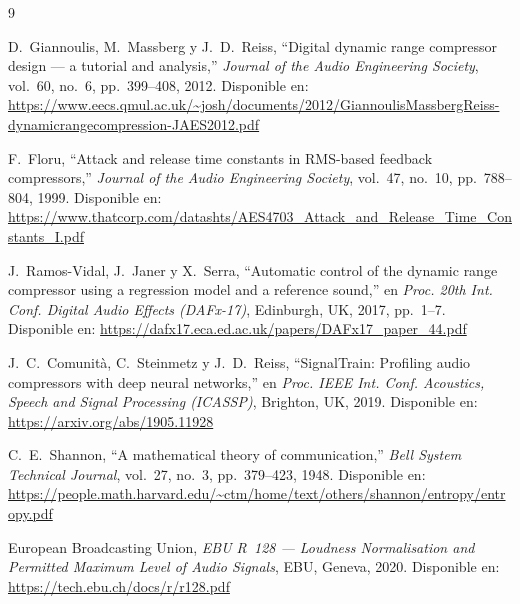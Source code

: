 \documentclass[a4paper,12pt]{article}
\begin{document}
\begin{thebibliography}{9}

D.~Giannoulis, M.~Massberg y J.~D.~Reiss,
``Digital dynamic range compressor design --- a tutorial and analysis,''
\textit{Journal of the Audio Engineering Society},
vol.~60, no.~6, pp.~399--408, 2012.
Disponible en:
\url{https://www.eecs.qmul.ac.uk/~josh/documents/2012/GiannoulisMassbergReiss-dynamicrangecompression-JAES2012.pdf}

F.~Floru,
``Attack and release time constants in RMS-based feedback compressors,''
\textit{Journal of the Audio Engineering Society},
vol.~47, no.~10, pp.~788--804, 1999.
Disponible en:
\url{https://www.thatcorp.com/datashts/AES4703_Attack_and_Release_Time_Constants_I.pdf}

J.~Ramos-Vidal, J.~Janer y X.~Serra,
``Automatic control of the dynamic range compressor using a regression model
and a reference sound,''
en \textit{Proc. 20th Int. Conf. Digital Audio Effects (DAFx-17)},
Edinburgh, UK, 2017, pp.~1--7.
Disponible en:
\url{https://dafx17.eca.ed.ac.uk/papers/DAFx17_paper_44.pdf}

J.~C.~Comunità, C.~Steinmetz y J.~D.~Reiss,
``SignalTrain: Profiling audio compressors with deep neural networks,''
en \textit{Proc. IEEE Int. Conf. Acoustics, Speech and Signal Processing
(ICASSP)}, Brighton, UK, 2019.
Disponible en:
\url{https://arxiv.org/abs/1905.11928}

C.~E.~Shannon,
``A mathematical theory of communication,''
\textit{Bell System Technical Journal},
vol.~27, no.~3, pp.~379--423, 1948.
Disponible en:
\url{https://people.math.harvard.edu/~ctm/home/text/others/shannon/entropy/entropy.pdf}

European Broadcasting Union,
\textit{EBU R~128 --- Loudness Normalisation and Permitted Maximum
Level of Audio Signals},
EBU, Geneva, 2020.
Disponible en:
\url{https://tech.ebu.ch/docs/r/r128.pdf}

\end{thebibliography}
\end{document}
